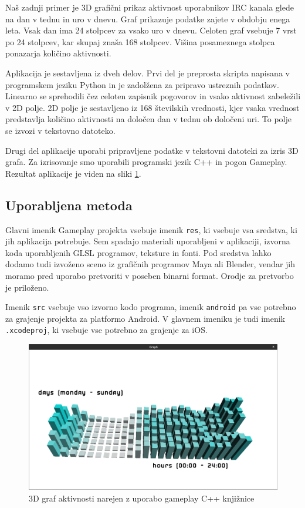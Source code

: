 Naš zadnji primer je 3D grafični prikaz aktivnost uporabnikov IRC kanala glede na dan v tednu in uro v dnevu. Graf prikazuje podatke zajete v obdobju enega leta. Vsak dan ima 24 stolpcev za vsako uro v dnevu. Celoten graf vsebuje 7 vrst po 24 stolpcev, kar skupaj znaša 168 stolpcev. Višina posameznega stolpca ponazarja količino aktivnosti.

Aplikacija je sestavljena iz dveh delov. Prvi del je preprosta skripta napisana v programskem jeziku Python in je zadolžena za pripravo ustreznih podatkov. Linearno se sprehodili čez celoten zapisnik pogovorov in vsako aktivnost zabeležili v 2D polje. 2D polje je sestavljeno iz 168 številskih vrednosti, kjer vsaka vrednost predstavlja količino aktivnosti na določen dan v tednu ob določeni uri. To polje se izvozi v tekstovno datoteko.

Drugi del aplikacije uporabi pripravljene podatke v tekstovni datoteki za izris 3D grafa. Za izrisovanje smo uporabili programski jezik C++ in pogon Gameplay. Rezultat aplikacije je viden na sliki \ref{cppgraph}.

\subsection{Uporabljena metoda}

Glavni imenik Gameplay projekta vsebuje imenik \texttt{res}, ki vsebuje vsa sredstva, ki jih aplikacija potrebuje. Sem spadajo materiali uporabljeni v aplikaciji, izvorna koda uporabljenih GLSL programov, teksture in fonti. Pod sredstva lahko dodamo tudi izvoženo sceno iz grafičnih programov Maya ali Blender, vendar jih moramo pred uporabo pretvoriti v poseben binarni format. Orodje za pretvorbo je priloženo.

Imenik \texttt{src} vsebuje vso izvorno kodo programa, imenik \texttt{android} pa vse potrebno za grajenje projekta za platformo Android. V glavnem imeniku je tudi imenik \texttt{.xcodeproj}, ki vsebuje vse potrebno za grajenje za iOS.

\begin{figure}
\begin{center}
\includegraphics[width=12cm]{pic/cpp.png}
\end{center}
\caption{3D graf aktivnosti narejen z uporabo gameplay C++ knjižnice}
\label{cppgraph}
\end{figure}

